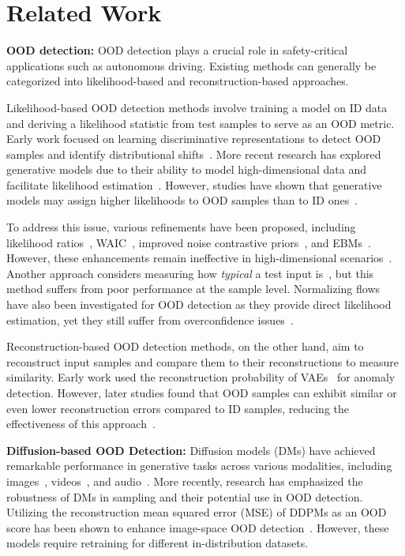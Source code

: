 \section{Related Work}
\textbf{\ac{OOD} detection:}
\ac{OOD} detection plays a crucial role in safety-critical applications such as autonomous driving. Existing methods can generally be categorized into likelihood-based and reconstruction-based approaches. 

Likelihood-based \ac{OOD} detection methods involve training a model on \ac{ID} data and deriving a likelihood statistic from test samples to serve as an \ac{OOD} metric. Early work focused on learning discriminative representations to detect \ac{OOD} samples and identify distributional shifts~\citep{denouden2018improvingreconstructionautoencoderoutofdistribution, NEURIPS2020_8965f766}. More recent research has explored generative models due to their ability to model high-dimensional data and facilitate likelihood estimation~\citep{NEURIPS2020_eddea82a}. However, studies have shown that generative models may assign higher likelihoods to \ac{OOD} samples than to \ac{ID} ones~\citep{nalisnick2019a, hendrycks2019oe}. 

To address this issue, various refinements have been proposed, including likelihood ratios~\citep{NEURIPS2019_1e795968}, \ac{WAIC}~\citep{choi2019generative}, improved noise contrastive priors~\citep{RAN2022199}, and \ac{EBM}s~\citep{liu2020energy}. However, these enhancements remain ineffective in high-dimensional scenarios~\citep{Graham_2023_CVPR}. Another approach considers measuring how \emph{typical} a test input is~\citep{nalisnick2020detecting}, but this method suffers from poor performance at the sample level. Normalizing flows~\citep{NEURIPS2018_d139db6a} have also been investigated for \ac{OOD} detection as they provide direct likelihood estimation, yet they still suffer from overconfidence issues~\citep{NEURIPS2020_ecb9fe2f}. 

Reconstruction-based \ac{OOD} detection methods, on the other hand, aim to reconstruct input samples and compare them to their reconstructions to measure similarity. Early work used the reconstruction probability of VAEs~\citep{an2015variational, kingma2013auto} for anomaly detection. However, later studies found that \ac{OOD} samples can exhibit similar or even lower reconstruction errors compared to \ac{ID} samples, reducing the effectiveness of this approach~\citep{denouden2018improvingreconstructionautoencoderoutofdistribution}. 

\textbf{Diffusion-based OOD Detection:}
Diffusion models (DMs) have achieved remarkable performance in generative tasks across various modalities, including images~\citep{ho2020denoising, song2021scorebased}, videos~\citep{ho2022video}, and audio~\citep{chen2020wavegradestimatinggradientswaveform}. More recently, research has emphasized the robustness of DMs in sampling and their potential use in \ac{OOD} detection. Utilizing the reconstruction mean squared error (MSE) of DDPMs as an \ac{OOD} score has been shown to enhance image-space \ac{OOD} detection~\citep{Wyatt_2022_CVPR, Graham_2023_CVPR}. However, these models require retraining for different in-distribution datasets. 

